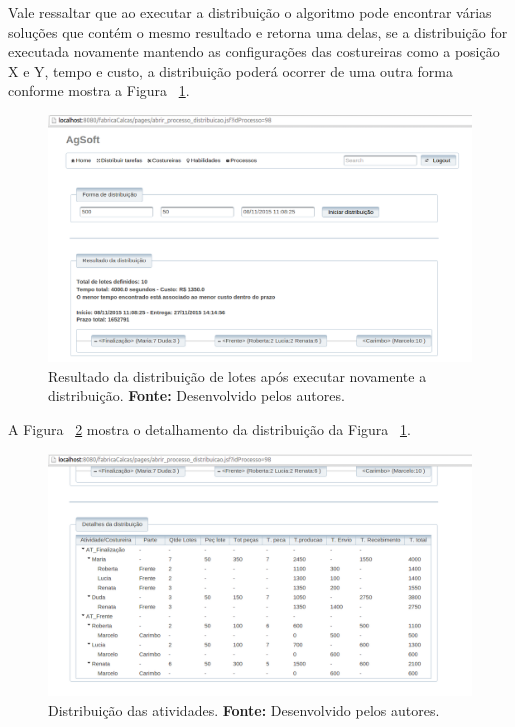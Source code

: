 \par Vale ressaltar que ao executar a distribuição o algoritmo pode
encontrar várias soluções que contém o mesmo resultado e retorna uma delas, se a
distribuição for executada novamente mantendo as configurações das costureiras
como a posição X e Y, tempo e custo, a distribuição poderá ocorrer de uma outra
forma conforme mostra a Figura ~\ref{fig:resultado2_teste5}.



\begin{figure}[h!]
	\centerline{\includegraphics[scale=0.3]{./imagens/resultado2_teste5.png}}
	\caption[Resultado da distribuição de lotes após executar novamente a
	distribuição.]
	{Resultado da distribuição de lotes após executar novamente a
	distribuição. \textbf{Fonte:} Desenvolvido pelos autores.}
	\label{fig:resultado2_teste5}
\end{figure}


\par A Figura ~\ref{fig:detalhamento2_teste5} mostra o detalhamento da
distribuição da Figura ~\ref{fig:resultado2_teste5}.

\newpage

\begin{figure}[h!]
	\centerline{\includegraphics[scale=0.3]{./imagens/detalhamento2_teste5.png}}
	\caption[Distribuição das atividades.] 
	{Distribuição das atividades. \textbf{Fonte:} Desenvolvido pelos
	autores.}
	\label{fig:detalhamento2_teste5}
\end{figure}


